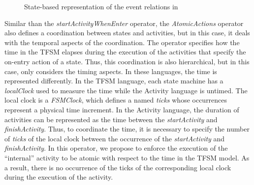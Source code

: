 \begin{figure}
	\centering
	\caption{State-based representation of the event relations in \moccml}
	\label{fig:subfigurestatebased}
\end{figure}



Similar than the \emph{startActivityWhenEnter} operator, the \emph{AtomicActions} operator also defines a coordination between states and activities, but in this case, it deals with the temporal aspects of the coordination. The operator specifies how the time in the TFSM elapses during the execution of the activities that specify the on-entry action of a state. Thus, this coordination is also hierarchical, but in this case, only considers the timing aspects. In these languages, the time is represented differently. In the TFSM language, each state machine has a \emph{localClock} used to measure the time while the Activity language is untimed. The local clock is a \emph{FSMClock}, which defines a \dse named \emph{ticks} whose occurrences represent a physical time increment. In the Activity language, the duration of activities can be represented as the time between the \dse \emph{startActivity} and \dse \emph{finishActivity}. Thus, to coordinate the time, it is necessary to specify the number of \emph{ticks} of the local clock between the occurrence of the \dse \emph{startActivity} and \emph{finishActivity}. In this operator, we propose to enforce the execution of the ``internal'' activity to be atomic with respect to the time in the TFSM model. As a result, there is no occurrence of the \dse ticks of the corresponding local clock during the execution of the activity. 

